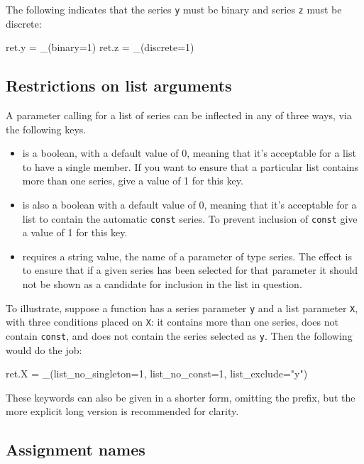 \documentclass[oneside]{book}
\begin{document}
The following indicates that the series \texttt{y} must be binary and
series \texttt{z} must be discrete:
\begin{code}
ret.y = _(binary=1)
ret.z = _(discrete=1)
\end{code}

\subsection{Restrictions on list arguments}

A parameter calling for a list of series can be inflected in any of
three ways, via the following keys.

\begin{itemize}
\item {} is a boolean, with a default value
  of 0, meaning that it's acceptable for a list to have a single
  member. If you want to ensure that a particular list contains more
  than one series, give a value of 1 for this key.
\item {} is also a boolean with a default value
  of 0, meaning that it's acceptable for a list to contain the
  automatic \texttt{const} series. To prevent inclusion of
  \texttt{const} give a value of 1 for this key.
\item {} requires a string value, the name of a
  parameter of type series. The effect is to ensure that if a given
  series has been selected for that parameter it should not be shown
  as a candidate for inclusion in the list in question.
\end{itemize}

To illustrate, suppose a function has a series parameter \texttt{y}
and a list parameter \texttt{X}, with three conditions placed on
\texttt{X}: it contains more than one series, does not contain
\texttt{const}, and does not contain the series selected as
\texttt{y}. Then the following would do the job:
\begin{code}
ret.X = _(list_no_singleton=1, list_no_const=1, list_exclude="y")
\end{code}

These keywords can also be given in a shorter form, omitting the
 prefix, but the more explicit long version is
recommended for clarity.

\subsection{Assignment names}
\end{document}
